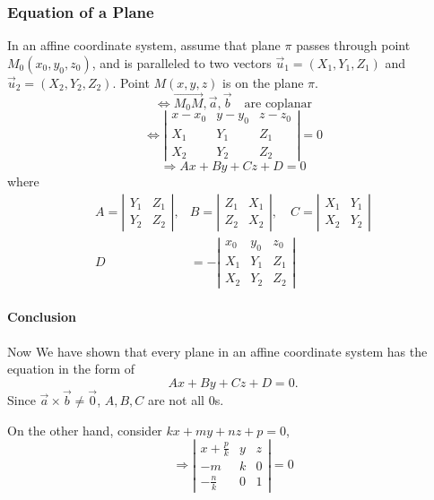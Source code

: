 \documentclass[11pt]{book}
\begin{document}
\subsubsection{Equation of a Plane}
In an affine coordinate system, assume that plane $\pi$ passes
through point $M_0(x_0,y_0,z_0)$, and is paralleled to two vectors 
$\vec u_1=(X_1,Y_1,Z_1)$ and $\vec u_2=(X_2,Y_2,Z_2)$. Point $M(x,y,z)$
is on the plane $\pi$.
$$
\iff \overrightarrow{M_0M},\vec a,\vec b \quad \text{are coplanar}
$$
$$
\iff
\left|\begin{array}{ccc}
  x-x_{0} & y-y_{0} & z-z_{0} \\
  X_{1} & Y_{1} & Z_{1} \\
  X_{2} & Y_{2} & Z_{2}
  \end{array}\right|=0
$$
$$
\Rightarrow Ax+By+Cz+D=0
$$
where
$$
\begin{aligned}
  A=\left|\begin{array}{ll}
  Y_{1} & Z_{1} \\
  Y_{2} & Z_{2}
  \end{array}\right|, & B=\left|\begin{array}{ll}
  Z_{1} & X_{1} \\
  Z_{2} & X_{2}
  \end{array}\right|, \quad C=\left|\begin{array}{ll}
  X_{1} & Y_{1} \\
  X_{2} & Y_{2}
  \end{array}\right| \\
  D &=-\left|\begin{array}{lll}
  x_{0} & y_{0} & z_{0} \\
  X_{1} & Y_{1} & Z_{1} \\
  X_{2} & Y_{2} & Z_{2}
  \end{array}\right|
  \end{aligned}
$$
\paragraph{Conclusion}Now We have shown that every plane in an affine coordinate system 
has the equation in the form of
$$
Ax+By+Cz+D=0.
$$
Since $\vec a \times \vec b \neq \vec 0$,
$A,B,C$ are not all $0$s.


On the other hand, consider $kx+my+nz+p=0$, 
$$
\Rightarrow 
\left|\begin{array}{ccc}
  x+\frac{p}{k} & y & z \\
  -m & k & 0 \\
  -\frac{n}{k} & 0 & 1
  \end{array}\right|=0
$$
\end{document}
